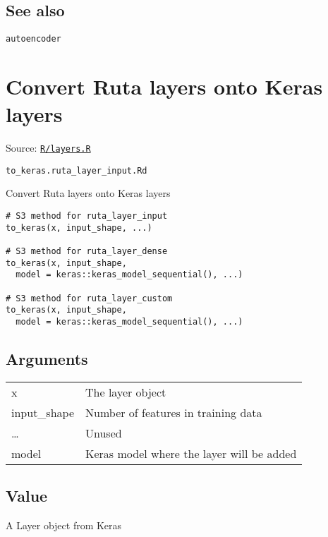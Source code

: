 \hypertarget{see-also}{\subsection{\texorpdfstring{\protect\hyperlink{see-also}{}See
also}{See also}}\label{see-also}}

\texttt{autoencoder}

\section{Convert Ruta layers onto Keras
layers}\label{convert-ruta-layers-onto-keras-layers}

Source:
\href{https://github.com/fdavidcl/ruta/blob/master/R/layers.R}{\texttt{R/layers.R}}

\texttt{to\_keras.ruta\_layer\_input.Rd}

Convert Ruta layers onto Keras layers

\begin{verbatim}
# S3 method for ruta_layer_input
to_keras(x, input_shape, ...)

# S3 method for ruta_layer_dense
to_keras(x, input_shape,
  model = keras::keras_model_sequential(), ...)

# S3 method for ruta_layer_custom
to_keras(x, input_shape,
  model = keras::keras_model_sequential(), ...)
\end{verbatim}

\hypertarget{arguments}{\subsection{\texorpdfstring{\protect\hyperlink{arguments}{}Arguments}{Arguments}}\label{arguments}}

\begin{longtable}[c]{@{}>{\small}p{3cm}>{\raggedright}p{12.5cm}@{}}
\toprule
x & The layer object\tabularnewline
input\_shape & Number of features in training data\tabularnewline
\ldots{} & Unused\tabularnewline
model & Keras model where the layer will be added\tabularnewline
\bottomrule
\end{longtable}

\hypertarget{value}{\subsection{\texorpdfstring{\protect\hyperlink{value}{}Value}{Value}}\label{value}}

A Layer object from Keras

